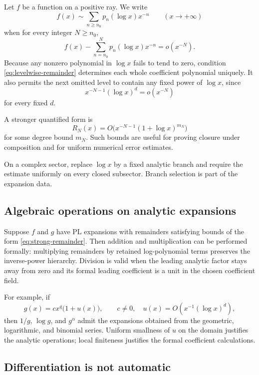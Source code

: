 \documentclass[11pt,oneside]{article}
\numberwithin{equation}{section}
\theoremstyle{definition}
\newcommand{\as}{\sim}
\begin{document}
Let \(f\) be a function on a positive ray.  We write
\begin{equation}\label{eq:analytic-PL-expansion}
  f(x)\as\sum_{n\ge n_0}p_n(\log x)x^{-n}
  \qquad(x\to+\infty)
\end{equation}
when for every integer \(N\ge n_0\),
\begin{equation}\label{eq:levelwise-remainder}
  f(x)-\sum_{n=n_0}^{N}p_n(\log x)x^{-n}
  =o(x^{-N}).
\end{equation}
Because any nonzero polynomial in \(\log x\) fails to tend to zero, condition
\eqref{eq:levelwise-remainder} determines each whole coefficient polynomial
uniquely.  It also permits the next omitted level to contain any fixed power of
\(\log x\), since
\[
  x^{-N-1}(\log x)^d=o(x^{-N})
\]
for every fixed \(d\).

A stronger quantified form is
\begin{equation}\label{eq:strong-remainder}
  R_N(x)=O\bigl(x^{-N-1}(1+\log x)^{m_N}\bigr)
\end{equation}
for some degree bound \(m_N\).  Such bounds are useful for proving closure under
composition and for uniform numerical error estimates.

On a complex sector, replace \(\log x\) by a fixed analytic branch and require
the estimate uniformly on every closed subsector.  Branch selection is part of
the expansion data.

\subsection{Algebraic operations on analytic expansions}

Suppose \(f\) and \(g\) have PL expansions with remainders satisfying bounds of
the form \eqref{eq:strong-remainder}.  Then addition and multiplication can be
performed formally: multiplying remainders by retained log-polynomial terms
preserves the inverse-power hierarchy.  Division is valid when the leading
analytic factor stays away from zero and its formal leading coefficient is a
unit in the chosen coefficient field.

For example, if
\[
  g(x)=c x^q\bigl(1+u(x)\bigr),
  \qquad c\ne0,\quad u(x)=O(x^{-1}(\log x)^d),
\]
then \(1/g\), \(\log g\), and \(g^\alpha\) admit the expansions obtained from
the geometric, logarithmic, and binomial series.  Uniform smallness of \(u\) on
the domain justifies the analytic operations; local finiteness justifies the
formal coefficient calculations.

\subsection{Differentiation is not automatic}
\end{document}
